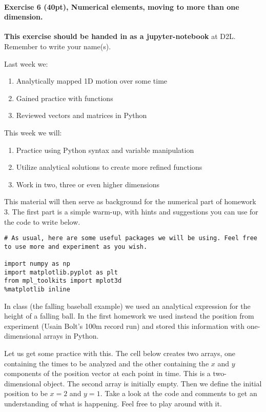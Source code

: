 \documentclass[%
oneside,                 %
final,                   %
10pt]{article}
\begin{document}
\paragraph{Exercise 6 (40pt), Numerical elements, moving to more than one dimension.}
\textbf{This exercise should be handed in as a jupyter-notebook} at D2L. Remember to write your name(s). 

Last week we:
\begin{enumerate}
\item Analytically mapped 1D motion over some time

\item Gained practice with functions

\item Reviewed vectors and matrices in Python
\end{enumerate}

\noindent
This week we will:
\begin{enumerate}
\item Practice using Python syntax and variable manipulation

\item Utilize analytical solutions to create more refined functions

\item Work in two, three or even higher dimensions
\end{enumerate}

\noindent
This material will then serve as background for the numerical part of homework 3. The first part is a simple warm-up, with hints and suggestions you can use for the code to write below. 

\begin{verbatim}
# As usual, here are some useful packages we will be using. Feel free to use more and experiment as you wish.

import numpy as np
import matplotlib.pyplot as plt
from mpl_toolkits import mplot3d
%matplotlib inline
\end{verbatim}

In class (the falling baseball example) we used an  analytical expression for the height of a falling ball.
In the first homework we used instead the position from experiment (Usain Bolt's 100m record run) and stored this
information with one-dimensional arrays in Python.

Let us get some practice with this. The cell below creates two arrays,
one containing the times to be analyzed and the other containing the $x$
and $y$ components of the position vector at each point in time.  This is a two-dimensional object. The
second array is initially empty. Then we define  the initial
position to be $x=2$ and $y=1$. Take a look at the code and comments
to get an understanding of what is happening. Feel free to play around with it.
\end{document}
